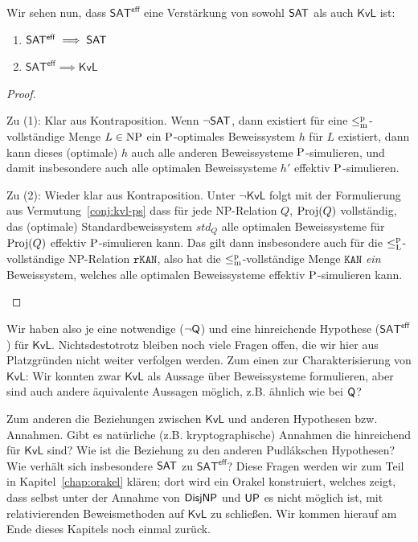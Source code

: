 Wir sehen nun, dass $\mathsf{SAT^{eff}}$ eine Verstärkung von sowohl $\hSAT$ als auch $\mathsf{KvL}$ ist:
\begin{theorem}\label{thm:sateff-generalizes-sat}
    \begin{enumerate}
        \item $\mathsf{SAT^{eff}}\implies \hSAT$
        \item $\mathsf{SAT^{eff}}\implies \mathsf{KvL}$
    \end{enumerate}
\end{theorem}
\begin{proof}
\begin{prooflist}
\item Zu (1): Klar aus Kontraposition. Wenn $\neg\hSAT$, dann existiert für eine $\leqmp$-vollständige Menge $L\in\NP$ ein $\P$-optimales Beweissystem $h$ für $L$ existiert, dann kann dieses (optimale) $h$ auch alle anderen Beweissysteme $\P$-simulieren, und damit insbesondere auch alle optimalen Beweissysteme $h'$ effektiv $\P$-simulieren.

\item Zu (2): Wieder klar aus Kontraposition. Unter $\neg\mathsf{KvL}$ folgt mit der Formulierung aus Vermutung~\ref{conj:kvl-ps} dass für jede NP-Relation $Q$, $\Proj(Q)$ vollständig, das (optimale) Standardbeweissystem $\mathit{std}_Q$ alle optimalen Beweissysteme für $\Proj(Q)$ effektiv $\P$-simulieren kann. Das gilt dann insbesondere auch für die $\leqlp$-vollständige NP-Relation $\mathtt{rKAN}$, also hat die $\leqmp$-vollständige Menge $\mathtt{KAN}$ \emph{ein} Beweissystem, welches alle optimalen Beweissysteme effektiv $\P$-simulieren kann.
\end{prooflist}
\end{proof}

Wir haben also je eine notwendige ($\neg\hQ$) und eine hinreichende Hypothese ($\mathsf{SAT^{eff}}$) für $\mathsf{KvL}$. 
Nichtsdestotrotz bleiben noch viele Fragen offen, die wir hier aus Platzgründen nicht weiter verfolgen werden. 
Zum einen zur Charakterisierung von $\mathsf{KvL}$:
Wir konnten zwar $\mathsf{KvL}$ als Aussage über Beweissysteme formulieren, aber sind auch andere äquivalente Aussagen möglich, z.B. ähnlich wie bei $\hQ$?

Zum anderen die Beziehungen zwischen $\mathsf{KvL}$ und anderen Hypothesen bzw. Annahmen.
Gibt es natürliche (z.B. kryptographische) Annahmen die hinreichend für $\mathsf{KvL}$ sind? Wie ist die Beziehung zu den anderen Pudlákschen Hypothesen? Wie verhält sich insbesondere $\hSAT$ zu $\mathsf{SAT^{eff}}$? 
Diese Fragen werden wir zum Teil in Kapitel~\ref{chap:orakel} klären; dort wird ein Orakel konstruiert, welches zeigt, dass selbst unter der Annahme von $\hDisjNP$ und $\hUP$ es nicht möglich ist, mit relativierenden Beweismethoden auf $\mathsf{KvL}$ zu schließen.
Wir kommen hierauf am Ende dieses Kapitels noch einmal zurück.

